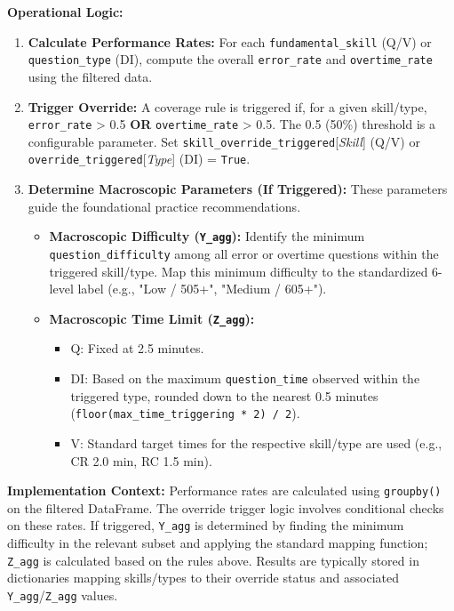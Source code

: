\documentclass{article}
\begin{document}
\textbf{Operational Logic:}
\begin{enumerate}
    \item \textbf{Calculate Performance Rates:} For each \texttt{fundamental\_skill} (Q/V) or \texttt{question\_type} (DI), compute the overall \texttt{error\_rate} and \texttt{overtime\_rate} using the filtered data.
    \item \textbf{Trigger Override:} A coverage rule is triggered if, for a given skill/type, \texttt{error\_rate} > 0.5 \textbf{OR} \texttt{overtime\_rate} > 0.5. The 0.5 (50\%) threshold is a configurable parameter. Set \texttt{skill\_override\_triggered}[\textit{Skill}] (Q/V) or \texttt{override\_triggered}[\textit{Type}] (DI) = \texttt{True}.
    \item \textbf{Determine Macroscopic Parameters (If Triggered):} These parameters guide the foundational practice recommendations.
    \begin{itemize}
        \item \textbf{Macroscopic Difficulty (\texttt{Y\_agg}):} Identify the minimum \texttt{question\_difficulty} among all error or overtime questions within the triggered skill/type. Map this minimum difficulty to the standardized 6-level label (e.g., "Low / 505+", "Medium / 605+").
        \item \textbf{Macroscopic Time Limit (\texttt{Z\_agg}):}
        \begin{itemize}
            \item Q: Fixed at 2.5 minutes.
            \item DI: Based on the maximum \texttt{question\_time} observed within the triggered type, rounded down to the nearest 0.5 minutes (\texttt{floor(max\_time\_triggering * 2) / 2}).
            \item V: Standard target times for the respective skill/type are used (e.g., CR 2.0 min, RC 1.5 min).
        \end{itemize}
    \end{itemize}
\end{enumerate}

\textbf{Implementation Context:} Performance rates are calculated using \texttt{groupby()} on the filtered DataFrame. The override trigger logic involves conditional checks on these rates. If triggered, \texttt{Y\_agg} is determined by finding the minimum difficulty in the relevant subset and applying the standard mapping function; \texttt{Z\_agg} is calculated based on the rules above. Results are typically stored in dictionaries mapping skills/types to their override status and associated \texttt{Y\_agg}/\texttt{Z\_agg} values.
\end{document}
